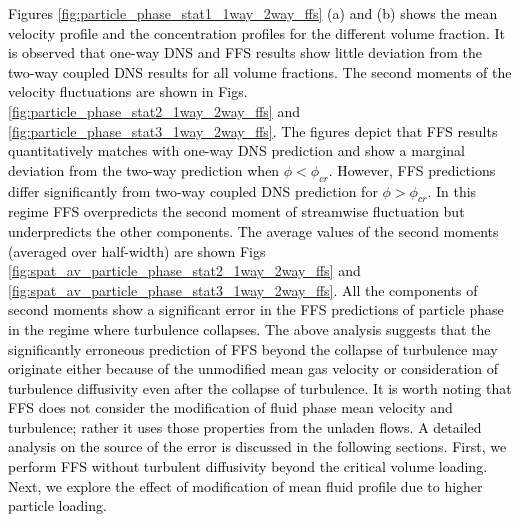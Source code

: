 \documentclass[notitlepage]{revtex4-1}
\begin{document}
\textcolor{black}{Figures \ref{fig:particle_phase_stat1_1way_2way_ffs} (a) and (b) shows the mean velocity profile and the concentration profiles for the different volume fraction. It is observed that one-way DNS and FFS results show little deviation from the two-way coupled DNS results for all volume fractions. The second moments of the velocity fluctuations are shown in Figs. \ref{fig:particle_phase_stat2_1way_2way_ffs} and \ref{fig:particle_phase_stat3_1way_2way_ffs}. The figures depict that FFS results quantitatively matches with one-way DNS prediction and show a marginal deviation from the two-way prediction when $\phi<\phi_{cr}$. However, FFS predictions differ significantly from two-way coupled DNS prediction for $\phi>\phi_{cr}$. In this regime FFS overpredicts the second moment of streamwise fluctuation but underpredicts the other components. The average values of the second moments (averaged over half-width) are shown Figs \ref{fig:spat_av_particle_phase_stat2_1way_2way_ffs} and \ref{fig:spat_av_particle_phase_stat3_1way_2way_ffs}. All the components of second moments show a significant error in the FFS predictions of particle phase in the regime where turbulence collapses. The above analysis suggests that the significantly erroneous prediction of FFS beyond the collapse of turbulence may originate either because of the unmodified mean gas velocity or consideration of turbulence diffusivity even after the collapse of turbulence. It is worth noting that FFS does not consider the modification of fluid phase mean velocity and turbulence; rather it uses those properties from the unladen flows. A detailed analysis on the source of the error is discussed in the following sections. First, we perform FFS without turbulent diffusivity beyond the critical volume loading. Next, we explore the effect of modification of mean fluid profile due to higher particle loading. }
\end{document}
